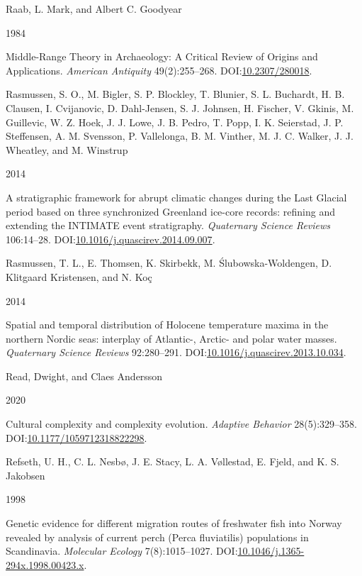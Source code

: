 \documentclass[
  12pt,
  a4paper,
  oneside]{book}
\newlength{\cslhangindent}
\newlength{\csllabelwidth}
\newlength{\cslentryspacingunit} %
\newenvironment{CSLReferences}[2] %
 {%
  \setlength{\parindent}{0pt}
  \ifodd #1
  \let\oldpar\par
  \def\par{\hangindent=\cslhangindent\oldpar}
  \fi
  \setlength{\parskip}{#2\cslentryspacingunit}
 }%
 {}
\newcommand{\CSLBlock}[1]{#1\hfill\break}
\newcommand{\CSLLeftMargin}[1]{\parbox[t]{\csllabelwidth}{#1}}
\newcommand{\CSLRightInline}[1]{\parbox[t]{\linewidth - \csllabelwidth}{#1}\break}
\begin{document}
\begin{CSLReferences}{0}{0}
\leavevmode{}%
\CSLBlock{Raab, L. Mark, and Albert C. Goodyear}
\CSLLeftMargin{ 1984}%
\CSLRightInline{{Middle-Range Theory in Archaeology: A Critical Review of Origins and Applications}. \emph{American Antiquity} 49(2):255--268. DOI:\href{https://doi.org/10.2307/280018}{10.2307/280018}.}

\leavevmode{}%
\CSLBlock{Rasmussen, S. O., M. Bigler, S. P. Blockley, T. Blunier, S. L. Buchardt, H. B. Clausen, I. Cvijanovic, D. Dahl-Jensen, S. J. Johnsen, H. Fischer, V. Gkinis, M. Guillevic, W. Z. Hoek, J. J. Lowe, J. B. Pedro, T. Popp, I. K. Seierstad, J. P. Steffensen, A. M. Svensson, P. Vallelonga, B. M. Vinther, M. J. C. Walker, J. J. Wheatley, and M. Winstrup}
\CSLLeftMargin{ 2014}%
\CSLRightInline{{A stratigraphic framework for abrupt climatic changes during the Last Glacial period based on three synchronized Greenland ice-core records: refining and extending the INTIMATE event stratigraphy}. \emph{Quaternary Science Reviews} 106:14--28. DOI:\href{https://doi.org/10.1016/j.quascirev.2014.09.007}{10.1016/j.quascirev.2014.09.007}.}

\leavevmode{}%
\CSLBlock{Rasmussen, T. L., E. Thomsen, K. Skirbekk, M. Ślubowska-Woldengen, D. Klitgaard Kristensen, and N. Koç}
\CSLLeftMargin{ 2014}%
\CSLRightInline{{Spatial and temporal distribution of Holocene temperature maxima in the northern Nordic seas: interplay of Atlantic-, Arctic- and polar water masses}. \emph{Quaternary Science Reviews} 92:280--291. DOI:\href{https://doi.org/10.1016/j.quascirev.2013.10.034}{10.1016/j.quascirev.2013.10.034}.}

\leavevmode{}%
\CSLBlock{Read, Dwight, and Claes Andersson}
\CSLLeftMargin{ 2020}%
\CSLRightInline{{Cultural complexity and complexity evolution}. \emph{Adaptive Behavior} 28(5):329--358. DOI:\href{https://doi.org/10.1177/1059712318822298}{10.1177/1059712318822298}.}

\leavevmode{}%
\CSLBlock{Refseth, U. H., C. L. Nesbø, J. E. Stacy, L. A. Vøllestad, E. Fjeld, and K. S. Jakobsen}
\CSLLeftMargin{ 1998}%
\CSLRightInline{Genetic evidence for different migration routes of freshwater fish into Norway revealed by analysis of current perch (Perca fluviatilis) populations in Scandinavia. \emph{Molecular Ecology} 7(8):1015--1027. DOI:\href{https://doi.org/10.1046/j.1365-294x.1998.00423.x}{10.1046/j.1365-294x.1998.00423.x}.}


\end{CSLReferences}
\end{document}

